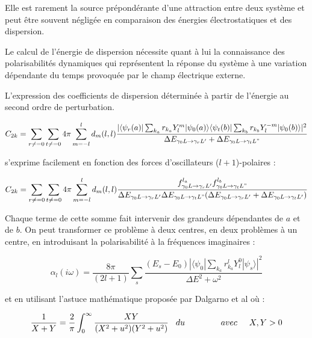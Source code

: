 Elle est rarement la source prépondérante d'une attraction entre deux système et peut être souvent négligée en comparaison des énergies électrostatiques et des dispersion. 
	
Le calcul de l'énergie de dispersion nécessite quant à lui la connaissance des polarisabilités dynamiques qui représentent la réponse du système à une variation dépendante du temps provoquée par le champ électrique externe. 
	
L'expression des coefficients de dispersion déterminée à partir de l'énergie au second ordre de perturbation.
	
\begin{equation}
C_{2k} = \sum_{r\neq=0} \sum_{t\neq=0} 4\pi \sum_{m=-l}^{l} d_{m} (l,l) \frac{|\langle \psi_{r}(a) | \sum_{k_{a}} r_{k_{a}} Y_{l}^{m}| \psi_{0} (a) \rangle \langle \psi_{t}(b)| \sum_{k_{b}} r_{k_{b}} Y_{l}^{-m}| \psi_{0}(b)\rangle|^{2}}{\Delta E_{\gamma_{0} L\rightarrow \gamma_{r} L'} + \Delta E_{\gamma_{0} L\rightarrow \gamma_{t} L"}}
\end{equation}
		
s'exprime facilement en fonction des forces d'oscillateurs ($l + 1$)-polaires :
	
\begin{equation}     
C_{2k} = \sum_{r\neq=0} \sum_{t\neq=0} 4\pi \sum_{m=-l}^{l} d_{m} (l,l)  \frac{f_{\gamma_{0}L\rightarrow \gamma_{r}L'}^{l_{a}} f_{\gamma_{0}L \rightarrow \gamma_{t}L"}^{l_{b}}}{\Delta E_{\gamma_{0}L\rightarrow \gamma_{r}L'} \Delta E_{\gamma_{0}L\rightarrow \gamma_{t}L"} (\Delta E_{\gamma_{0}L\rightarrow \gamma_{r}L'} + \Delta E_{\gamma_{0}L\rightarrow \gamma_{t}L'})}
\end{equation}
		
Chaque terme de cette somme fait intervenir des grandeurs dépendantes de $a$ et de $b$. On peut transformer ce problème à deux centres, en deux problèmes à un centre, en introduisant la polarisabilité à la fréquences imaginaires : 
	
\begin{equation}
\alpha_{l}(i\omega) = \frac{8\pi}{(2l + 1)} \sum_{s} \frac{(E_{s} - E_{0}) |\langle \psi_{0}| \sum_{k_{a}} r_{k_{a}}^{l} Y_{l}^{0} | \psi_{s}\rangle|^{2}}{\Delta E^{2} + \omega^{2}}
\end{equation}

et en utilisant l'astuce mathématique proposée par Dalgarno et al\cite{dalgarno1966calculation,linder1962generalized,chan1965long,dalgarno1966long} où : 
	
\begin{equation}
\frac{1}{X + Y} = \frac{2}{\pi} \int_{0}^{\infty} \frac{XY}{(X^{2} + u^{2}) (Y^{2} + u^{2})} \hspace{0.3cm} du \hspace{1.5cm} avec \hspace{0.5cm} X,Y > 0
\end{equation}
	
